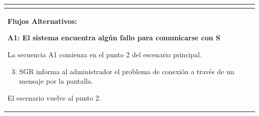 \begin{longtable}{|l|p{5.5cm}|l|p{2cm}|l|p{1.9cm}|}
{					} \\ \hline

					\multicolumn{6}{|p{15cm}|}{ \textbf{Flujos Alternativos: }
					
					\textbf{A1: El sistema encuentra algún fallo para comunicarse con S}
					
					La secuencia A1 comienza en el punto 2 del escenario principal.
					\begin{enumerate}
							\setcounter{enumi}{2}
							\item SGR informa al administrador el problema de conexión a través de un mensaje por la pantalla.
					\end{enumerate}

					El escenario vuelve al punto 2.

					} \\ \hline

			\end{longtable}

